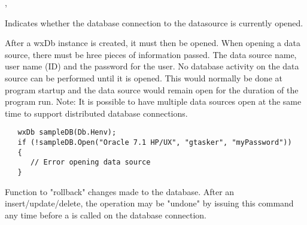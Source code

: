 
, 

\label{wxdbisopen}


Indicates whether the database connection to the datasource is currently opened.

\label{wxdbopen}





After a wxDb instance is created, it must then be opened.  When opening a data source, there must be hree pieces of information passed.  The data source name, user name (ID) and the password for the user.  No database activity on the data source can be performed until it is opened.  This would normally be done at program startup and the data source would remain open for the duration of the program run.  Note: It is possible to have multiple data sources open at the same time to support distributed database connections. 

\begin{verbatim}
   wxDb sampleDB(Db.Henv);
   if (!sampleDB.Open("Oracle 7.1 HP/UX", "gtasker", "myPassword"))
   {
      // Error opening data source
   }
\end{verbatim}


\label{wxdbrollbacktrans}


Function to "rollback" changes made to the database.  After an insert/update/delete, the operation may be "undone" by issuing this command any time before a  is called on the database connection.


